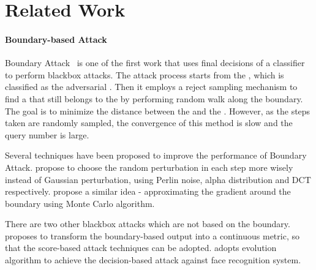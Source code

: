 \section{Related Work}

\paragraph{Boundary-based Attack}
Boundary Attack~\cite{brendel2017decision} is one of the first work that uses final decisions of a classifier to perform blackbox attacks. The attack process starts from the \sourceimage, which is classified as the adversarial \maliciousclass. Then it employs a reject sampling mechanism to find a \boundaryimage that still belongs to the \maliciousclass by performing random walk along the boundary. The goal is to minimize the distance between the \boundaryimage and the \targetimage. However, as the steps taken are randomly sampled, the convergence of this method is slow and the query number is large.

Several techniques have been proposed to improve the performance of Boundary Attack. \cite{brunner2019guessing,srinivasan2019black,guo2018low} propose to choose the random perturbation in each step more wisely instead of Gaussian perturbation, using Perlin noise, alpha distribution and DCT respectively. \cite{ilyas2018black,khalid2019red,liu2019geometry,chen2019hopskipjumpattack} propose a similar idea - approximating the gradient around the boundary using Monte Carlo algorithm. 

There are two other blackbox attacks which are not based on the boundary. \cite{cheng2018query} proposes to transform the boundary-based output into a continuous metric, so that the score-based attack techniques can be adopted. \cite{dong2019efficient} adopts evolution algorithm to achieve the decision-based attack against face recognition system.
\vspace{-5mm}
